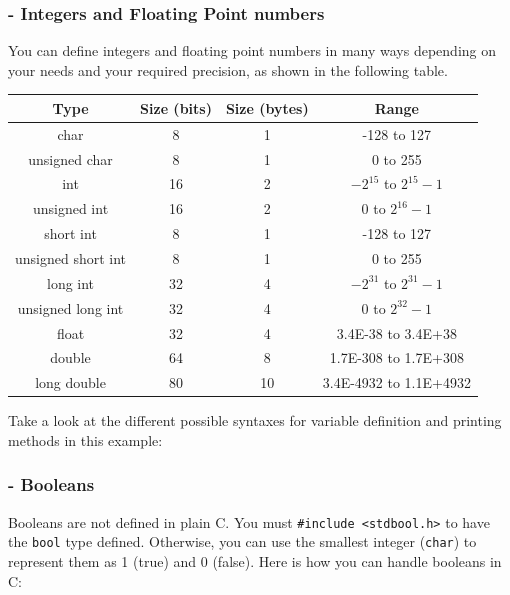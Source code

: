 \subsubsection{- Integers and Floating Point numbers}

You can define integers and floating point numbers in many ways depending on your needs and your required precision, as shown in the following table.

\begin{table}[h]
\centering
\begin{tabular}{|c|c|c|c|}
\hline
\textbf{Type} & \textbf{Size (bits)} & \textbf{Size (bytes)} & \textbf{Range} \\
\hline
char & 8 & 1 & -128 to 127 \\
\hline
unsigned char & 8 & 1 & 0 to 255 \\
\hline
int & 16 & 2 & $-2^{15}$ to $2^{15}-1$ \\
\hline
unsigned int & 16 & 2 & 0 to $2^{16}-1$ \\
\hline
short int & 8 & 1 & -128 to 127 \\
\hline
unsigned short int & 8 & 1 & 0 to 255 \\
\hline
long int & 32 & 4 & $-2^{31}$ to $2^{31}-1$ \\
\hline
unsigned long int & 32 & 4 & 0 to $2^{32}-1$ \\
\hline
float & 32 & 4 & 3.4E-38 to 3.4E+38 \\
\hline
double & 64 & 8 & 1.7E-308 to 1.7E+308 \\
\hline
long double & 80 & 10 & 3.4E-4932 to 1.1E+4932 \\
\hline
\end{tabular}
\end{table}

Take a look at the different possible syntaxes for variable definition and printing methods in this example: 



\subsubsection{- Booleans}

Booleans are not defined in plain C. You must \texttt{\#include <stdbool.h>} to have the \texttt{bool} type defined. Otherwise, you can use the smallest integer (\texttt{char}) to represent them as 1 (true) and 0 (false). Here is how you can handle booleans in C:



